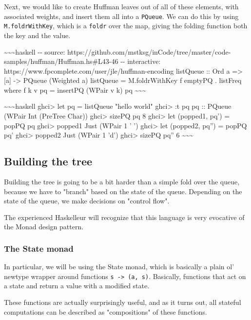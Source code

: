 \documentclass[]{article}
\begin{document}
Next, we would like to create Huffman leaves out of all of these elements, with
associated weights, and insert them all into a \texttt{PQueue}. We can do this
by using \texttt{M.foldrWithKey}, which is a \texttt{foldr} over the map, giving
the folding function both the key and the value.

\textasciitilde{}\textasciitilde{}\textasciitilde{}haskell -\/- source:
https://github.com/mstksg/inCode/tree/master/code-samples/huffman/Huffman.hs\#L43-46
-\/- interactive: https://www.fpcomplete.com/user/jle/huffman-encoding listQueue
:: Ord a =\textgreater{} {[}a{]} -\textgreater{} PQueue (Weighted a) listQueue =
M.foldrWithKey f emptyPQ . listFreq where f k v pq = insertPQ (WPair v k) pq
\textasciitilde{}\textasciitilde{}\textasciitilde{}

\textasciitilde{}\textasciitilde{}\textasciitilde{}haskell ghci\textgreater{}
let pq = listQueue "hello world" ghci\textgreater{} :t pq pq :: PQueue (WPair
Int (PreTree Char)) ghci\textgreater{} sizePQ pq 8 ghci\textgreater{} let
(popped1, pq') = popPQ pq ghci\textgreater{} popped1 Just (WPair 1 ' ')
ghci\textgreater{} let (popped2, pq'') = popPQ pq' ghci\textgreater{} popped2
Just (WPair 1 'd') ghci\textgreater{} sizePQ pq'' 6
\textasciitilde{}\textasciitilde{}\textasciitilde{}

\subsection{Building the tree}

Building the tree is going to be a bit harder than a simple fold over the queue,
because we have to "branch" based on the state of the queue. Depending on the
state of the queue, we make decisions on "control flow".

The experienced Haskelleur will recognize that this language is very evocative
of the Monad design pattern.

\subsubsection{The State monad}

In particular, we will be using the State monad, which is basically a plain ol'
newtype wrapper around functions \texttt{s\ -\textgreater{}\ (a,\ s)}.
Basically, functions that act on a state and return a value with a modified
state.

These functions are actually surprisingly useful, and as it turns out, all
stateful computations can be described as "compositions" of these functions.
\end{document}
